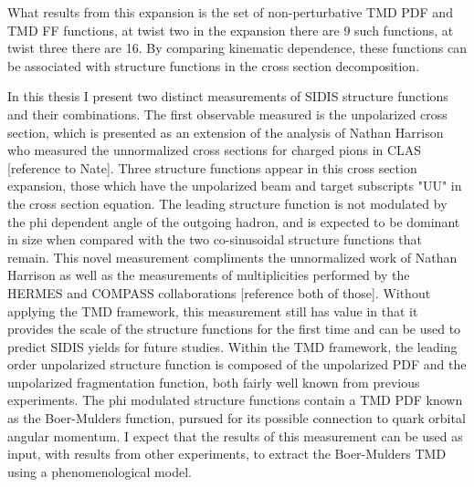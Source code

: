 What results from this expansion is the set of non-perturbative TMD PDF and TMD FF functions, at twist two in the expansion there are 9 such functions, at twist three there are 16.  By comparing kinematic dependence, these functions can be associated with structure functions in the cross section decomposition.


In this thesis I present two distinct measurements of SIDIS structure functions and their combinations.  The first observable measured is the unpolarized cross section, which is presented as an extension of the analysis of Nathan Harrison who measured the unnormalized cross sections for charged pions in CLAS [reference to Nate].  Three structure functions appear in this cross section expansion, those which have the unpolarized beam and target subscripts "UU" in the cross section equation.  The leading structure function is not modulated by the phi dependent angle of the outgoing hadron, and is expected to be dominant in size when compared with the two co-sinusoidal structure functions that remain.  This novel measurement compliments the unnormalized work of Nathan Harrison as well as the measurements of multiplicities performed by the HERMES and COMPASS collaborations [reference both of those].  Without applying the TMD framework, this measurement still has value in that it provides the scale of the structure functions for the first time and can be used to predict SIDIS yields for future studies.  Within the TMD framework, the leading order unpolarized structure function is composed of the unpolarized PDF and the unpolarized fragmentation function, both fairly well known from previous experiments.  The phi modulated structure functions contain a TMD PDF known as the Boer-Mulders function, pursued for its possible connection to quark orbital angular momentum.  I expect that the results of this measurement can be used as input, with results from other experiments, to extract the Boer-Mulders TMD using a phenomenological model.

